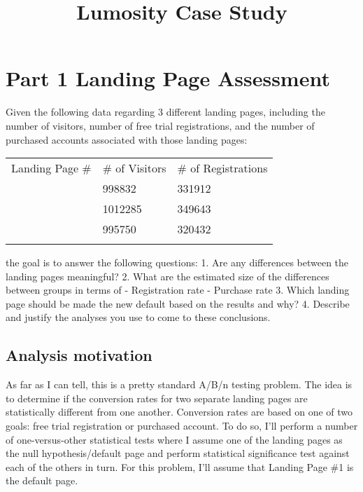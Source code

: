 \documentclass{article}
\title{Lumosity Case Study}
\begin{document}
    
    
    \maketitle
    
    

    
    \section{Part 1 Landing Page
Assessment}\label{part-1-landing-page-assessment}

Given the following data regarding 3 different landing pages, including
the number of visitors, number of free trial registrations, and the
number of purchased accounts associated with those landing pages:

\begin{longtable}[c]{@{}lll@{}}
\toprule\addlinespace
Landing Page \# & \# of Visitors & \# of Registrations
\\\addlinespace
\midrule\endhead
1 & 998832 & 331912
\\\addlinespace
2 & 1012285 & 349643
\\\addlinespace
3 & 995750 & 320432
\\\addlinespace
\bottomrule
\end{longtable}

the goal is to answer the following questions: 1. Are any differences
between the landing pages meaningful? 2. What are the estimated size of
the differences between groups in terms of - Registration rate -
Purchase rate 3. Which landing page should be made the new default based
on the results and why? 4. Describe and justify the analyses you use to
come to these conclusions.

    \subsection{Analysis motivation}\label{analysis-motivation}

As far as I can tell, this is a pretty standard A/B/n testing problem.
The idea is to determine if the conversion rates for two separate
landing pages are statistically different from one another. Conversion
rates are based on one of two goals: free trial registration or
purchased account. To do so, I'll perform a number of one-versus-other
statistical tests where I assume one of the landing pages as the null
hypothesis/default page and perform statistical significance test
against each of the others in turn. For this problem, I'll assume that
Landing Page \#1 is the default page.
\end{document}

